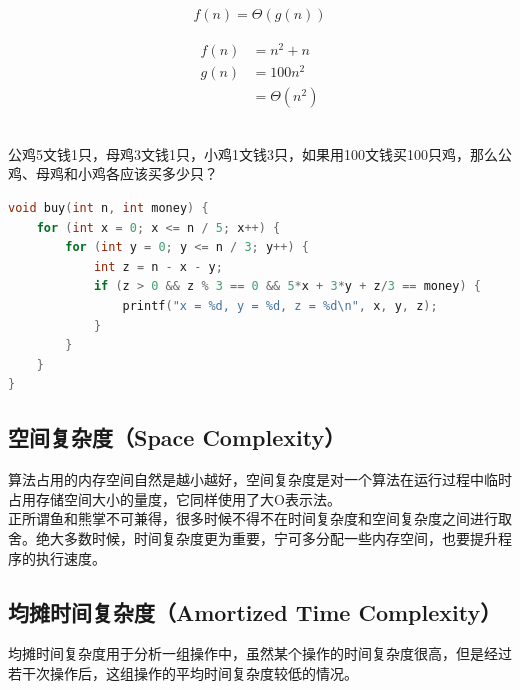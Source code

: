 \vspace{-0.5cm}

\begin{align}
	f(n) = \Theta(g(n))
\end{align}

\vspace{-1cm}

\begin{align*}
	f(n) & = n^2 + n     \\
	g(n) & = 100n^2      \\
	     & = \Theta(n^2)
\end{align*}

\vspace{0.5cm}

\\

公鸡5文钱1只，母鸡3文钱1只，小鸡1文钱3只，如果用100文钱买100只鸡，那么公鸡、母鸡和小鸡各应该买多少只？

\begin{lstlisting}[language=C]
void buy(int n, int money) {
	for (int x = 0; x <= n / 5; x++) {
		for (int y = 0; y <= n / 3; y++) {
			int z = n - x - y;
			if (z > 0 && z % 3 == 0 && 5*x + 3*y + z/3 == money) {
				printf("x = %d, y = %d, z = %d\n", x, y, z);
			}
		}
	}
}
\end{lstlisting}

\vspace{0.5cm}

\subsection{空间复杂度（Space Complexity）}

算法占用的内存空间自然是越小越好，空间复杂度是对一个算法在运行过程中临时占用存储空间大小的量度，它同样使用了大O表示法。\\

正所谓鱼和熊掌不可兼得，很多时候不得不在时间复杂度和空间复杂度之间进行取舍。绝大多数时候，时间复杂度更为重要，宁可多分配一些内存空间，也要提升程序的执行速度。

\vspace{0.5cm}

\subsection{均摊时间复杂度（Amortized Time Complexity）}

均摊时间复杂度用于分析一组操作中，虽然某个操作的时间复杂度很高，但是经过若干次操作后，这组操作的平均时间复杂度较低的情况。\\

